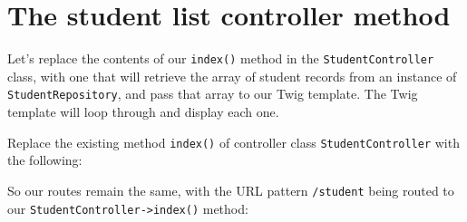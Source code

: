 \documentclass[a4paperpaper,openright]{book}
\newenvironment{Shaded}{}{}
\newcommand{\AnnotationTok}[1]{\textcolor[rgb]{0.38,0.63,0.69}{\textbf{\textit{#1}}}}
\newcommand{\CommentTok}[1]{\textcolor[rgb]{0.38,0.63,0.69}{\textit{#1}}}
\newcommand{\KeywordTok}[1]{\textcolor[rgb]{0.00,0.44,0.13}{\textbf{#1}}}
\newcommand{\NormalTok}[1]{#1}
\newcommand{\OtherTok}[1]{\textcolor[rgb]{0.00,0.44,0.13}{#1}}
\newcommand{\StringTok}[1]{\textcolor[rgb]{0.25,0.44,0.63}{#1}}
\begin{document}
\hypertarget{the-student-list-controller-method}{%
\section{The student list controller
method}\label{the-student-list-controller-method}}

Let's replace the contents of our \texttt{index()} method in the
\texttt{StudentController} class, with one that will retrieve the array
of student records from an instance of \texttt{StudentRepository}, and
pass that array to our Twig template. The Twig template will loop
through and display each one.

Replace the existing method \texttt{index()} of controller class
\texttt{StudentController} with the following:

\begin{Shaded}
\end{Shaded}

So our routes remain the same, with the URL pattern \texttt{/student}
being routed to our \texttt{StudentController-\textgreater{}index()}
method:
\end{document}
